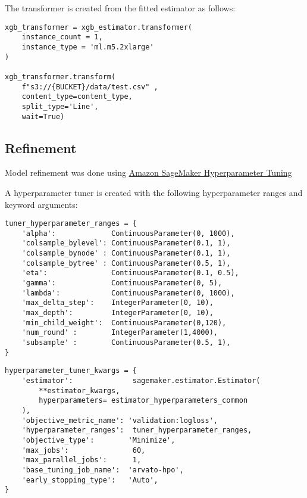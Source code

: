 \documentclass[a4paper]{article}
\begin{document}
{\begin{enumerate}
      The transformer is created from the fitted estimator as follows:
      
      \begin{verbatim}
xgb_transformer = xgb_estimator.transformer(
    instance_count = 1, 
    instance_type = 'ml.m5.2xlarge'
)

xgb_transformer.transform(
    f"s3://{BUCKET}/data/test.csv" , 
    content_type=content_type, 
    split_type='Line', 
    wait=True)
  \end{verbatim}

    \end{enumerate}

\pagebreak
    \subsection{Refinement}
    \label{sec:refinement}
    Model refinement was done using \href{https://docs.aws.amazon.com/sagemaker/latest/dg/automatic-model-tuning.html}{Amazon SageMaker Hyperparameter Tuning}

    A hyperparameter tuner is created with the following hyperparameter ranges and keyword arguments:
    
    \begin{verbatim}
tuner_hyperparameter_ranges = {
    'alpha':             ContinuousParameter(0, 1000),
    'colsample_bylevel': ContinuousParameter(0.1, 1),
    'colsample_bynode' : ContinuousParameter(0.1, 1),
    'colsample_bytree' : ContinuousParameter(0.5, 1),
    'eta':               ContinuousParameter(0.1, 0.5),  
    'gamma':             ContinuousParameter(0, 5),  
    'lambda':            ContinuousParameter(0, 1000), 
    'max_delta_step':    IntegerParameter(0, 10),
    'max_depth':         IntegerParameter(0, 10),
    'min_child_weight':  ContinuousParameter(0,120),
    'num_round' :        IntegerParameter(1,4000),
    'subsample' :        ContinuousParameter(0.5, 1),
}
    \end{verbatim}

    \begin{verbatim}
hyperparameter_tuner_kwargs = {
    'estimator':              sagemaker.estimator.Estimator(
        **estimator_kwargs, 
        hyperparameters= estimator_hyperparameters_common
    ),
    'objective_metric_name': 'validation:logloss',
    'hyperparameter_ranges':  tuner_hyperparameter_ranges,
    'objective_type':        'Minimize',
    'max_jobs':               60,
    'max_parallel_jobs':      1,
    'base_tuning_job_name':  'arvato-hpo',
    'early_stopping_type':   'Auto',
}
    \end{verbatim}

}
\end{document}
